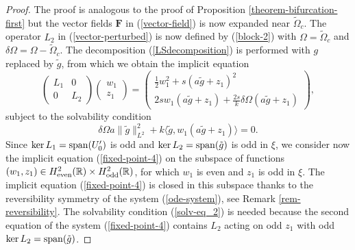 \documentclass[12pt,reqno]{amsart}
\numberwithin{equation}{section}
\begin{document}
\begin{proof}
The proof is analogous to the proof of Proposition \ref{theorem-bifurcation-first} but the vector fields \(\mathbf{F}\) in (\ref{vector-field}) 
is now expanded near \(\widetilde{\Omega}_c\). The operator $L_2$ in (\ref{vector-perturbed}) is now 
defined by (\ref{block-2}) with $\Omega = \widetilde{\Omega}_c$ and $\delta \Omega = \Omega - \widetilde{\Omega}_c$. 
The decomposition (\ref{LSdecomposition}) is performed with $g$ replaced by $\tilde{g}$, from which we obtain 
the implicit equation 
\begin{equation}
    \label{fixed-point-4}
\begin{pmatrix} L_1 & 0  \\ 
0 & L_2 
\end{pmatrix} \begin{pmatrix} w_1 \\ z_1 \end{pmatrix} = \begin{pmatrix} \frac{1}{2} w_1^2 + s (a \tilde{g} +z_1)^2 \\  
    2 s w_1 (a \tilde{g} + z_1) + \frac{2 s}{k} \delta \Omega (a \tilde{g} + z_1) \end{pmatrix},
\end{equation}
subject to the solvability condition 
\begin{equation}
    \label{solv-eq_2}
\delta \Omega a \| \tilde{g} \|^2_{L^2} + k  \langle \tilde{g}, w_1 (a \tilde{g} + z_1)\rangle = 0. 
\end{equation}
Since $\ker L_1 = {\rm span}(U_0')$ is odd and $\ker L_2 = {\rm span}(\tilde{g})$ is odd in $\xi$, we consider 
now the implicit equation (\ref{fixed-point-4}) on the subspace of functions $(w_1,z_1) \in H^2_{\rm even}(\mathbb{R}) \times H^2_{\rm odd}(\mathbb{R})$, 
for which $w_1$ is even and $z_1$ is odd in $\xi$. The implicit equation (\ref{fixed-point-4}) is closed in this subspace 
thanks to the reversibility symmetry of the system (\ref{ode-system}), see Remark \ref{rem-reversibility}.
The solvability condition (\ref{solv-eq_2}) is needed because the second equation of the system (\ref{fixed-point-4}) 
contains $L_2$ acting on odd $z_1$ with odd $\ker L_2 = {\rm span}(\tilde{g})$.


\end{proof}
\end{document}
